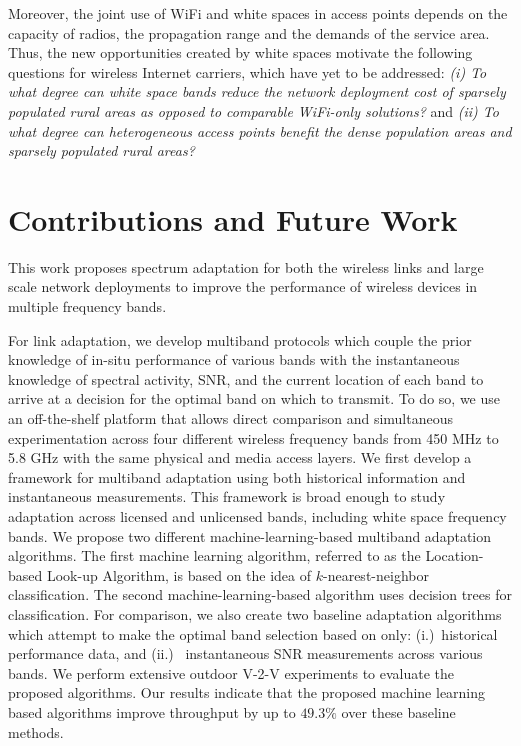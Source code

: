Moreover, the joint use of WiFi and white spaces  in 
access points depends on the capacity of radios, the propagation range 
and the demands of the service area. 
Thus, the new opportunities created by white spaces motivate the following 
questions for wireless Internet carriers, which have yet to be addressed: 
{\it (i) To what degree can white space bands reduce the network deployment 
cost of sparsely populated rural areas as opposed to comparable WiFi-only 
solutions?} and {\it (ii) To what degree can heterogeneous access points 
benefit the dense population areas and sparsely populated rural areas?}


\section{Contributions and Future Work}

This work proposes spectrum adaptation for both the wireless links and 
large scale network deployments to improve the performance of wireless devices in 
multiple frequency bands.

For link adaptation, we develop multiband protocols 
which couple the prior knowledge of in-situ performance of various bands 
with the instantaneous knowledge of spectral activity, SNR, and the current 
location of each band to arrive at a decision for the optimal band on which to transmit. 
To do so, we use an off-the-shelf platform that allows direct comparison and 
simultaneous experimentation across four different wireless frequency bands 
from 450 MHz to 5.8 GHz with the same physical and media access layers. 
We first develop a framework for multiband adaptation using both historical 
information and instantaneous measurements. This framework is broad enough 
to study adaptation across licensed and unlicensed bands, including white 
space frequency bands. We propose two different machine-learning-based 
multiband adaptation algorithms. The first machine learning algorithm, 
referred to as the Location-based Look-up Algorithm, is based on the idea 
of $k$-nearest-neighbor classification. The second machine-learning-based 
algorithm uses decision trees for classification. For comparison, we also 
create two baseline adaptation algorithms which attempt to make the optimal
band selection based on only: (i.)~historical performance data, and (ii.)
~instantaneous SNR measurements across various bands. We perform extensive 
outdoor V-2-V experiments to evaluate the proposed algorithms. Our results 
indicate that the proposed machine learning based algorithms improve throughput 
by up to $49.3\%$ over these baseline methods.

